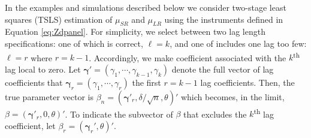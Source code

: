 In the examples and simulations described below we consider two-stage least squares (TSLS) estimation of $\mu_{SR}$ and $\mu_{LR}$ using the instruments defined in Equation \ref{eq:Zdpanel}. 
For simplicity, we select between two lag length specifications: one of which is correct, $\ell = k$, and one of includes one lag too few: $\ell = r$ where $r = k-1$.
Accordingly, we make coefficient associated with the $k$\textsuperscript{th} lag local to zero.
Let $\boldsymbol{\gamma}' = (\gamma_1, \cdots, \gamma_{k-1}, \gamma_{k})$ denote the full vector of lag coefficients that $\boldsymbol{\gamma}_{r} = (\gamma_1, \cdots, \gamma_{r})$ the first $r = k-1$ lag coefficients.
Then, the true parameter vector is $\beta_n = (\boldsymbol{\gamma}'_{r}, \delta/\sqrt{n}, \theta)'$ which becomes, in the limit, $\beta = (\boldsymbol{\gamma}'_r, 0, \theta)'$.
To indicate the subvector of $\beta$ that excludes the $k$\textsuperscript{th} lag coefficient, let $\beta_{r} = (\boldsymbol{\gamma}_r', \theta)'$.

